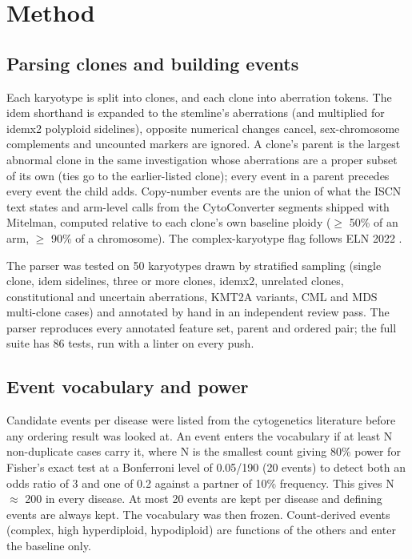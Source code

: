 \documentclass[conference]{IEEEtran}
\begin{document}
\section{Method}
\subsection{Parsing clones and building events}
Each karyotype is split into clones, and each clone into aberration tokens. The idem shorthand is expanded to the stemline's aberrations (and multiplied for idemx2 polyploid sidelines), opposite numerical changes cancel, sex-chromosome complements and uncounted markers are ignored. A clone's parent is the largest abnormal clone in the same investigation whose aberrations are a proper subset of its own (ties go to the earlier-listed clone); every event in a parent precedes every event the child adds. Copy-number events are the union of what the ISCN text states and arm-level calls from the CytoConverter \cite{cytoconverter} segments shipped with Mitelman, computed relative to each clone's own baseline ploidy ($\geq$ 50\% of an arm, $\geq$ 90\% of a chromosome). The complex-karyotype flag follows ELN 2022 \cite{dohner2022}.

The parser was tested on 50 karyotypes drawn by stratified sampling (single clone, idem sidelines, three or more clones, idemx2, unrelated clones, constitutional and uncertain aberrations, KMT2A variants, CML and MDS multi-clone cases) and annotated by hand in an independent review pass. The parser reproduces every annotated feature set, parent and ordered pair; the full suite has 86 tests, run with a linter on every push.

\subsection{Event vocabulary and power}
Candidate events per disease were listed from the cytogenetics literature before any ordering result was looked at. An event enters the vocabulary if at least N non-duplicate cases carry it, where N is the smallest count giving 80\% power for Fisher's exact test at a Bonferroni level of 0.05/190 (20 events) to detect both an odds ratio of 3 and one of 0.2 against a partner of 10\% frequency. This gives N $\approx$ 200 in every disease. At most 20 events are kept per disease and defining events are always kept. The vocabulary was then frozen. Count-derived events (complex, high hyperdiploid, hypodiploid) are functions of the others and enter the baseline only.
\end{document}
